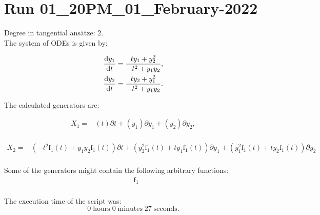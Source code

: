 \section*{Run 01\_20PM\_01\_February-2022}
Degree in tangential ansätze:	2.\\
The system of ODEs is given by:

\begin{align*}
\dv{y_{1}}{t}&=\frac{t y_{1} + y_{2}^{2}}{- t^{2} + y_{1} y_{2}},\\
\dv{y_{2}}{t}&=\frac{t y_{2} + y_{1}^{2}}{- t^{2} + y_{1} y_{2}}.\\
\end{align*}

\noindent The calculated generators are:

\begin{align*}
X_{1}=&\left(t \right)\partial t+\left(y_{1} \right)\partial y_{1}+\left(y_{2} \right)\partial y_{2},\\
\end{align*}

\begin{align*}
X_{2}=&\left(- t^{2} \operatorname{f_{1}}{\left(t \right)}+y_{1} y_{2} \operatorname{f_{1}}{\left(t \right)} \right)\partial t+\left(y_{2}^{2} \operatorname{f_{1}}{\left(t \right)}+t y_{1} \operatorname{f_{1}}{\left(t \right)} \right)\partial y_{1}+\left(y_{1}^{2} \operatorname{f_{1}}{\left(t \right)}+t y_{2} \operatorname{f_{1}}{\left(t \right)} \right)\partial y_{2}\\
\end{align*}



\noindent Some of the generators might contain the following arbitrary functions:
\begin{align*}
&\operatorname{f_{1}}\\
\end{align*}

\noindent The execution time of the script was:
$$0\;\mathrm{hours}\;0\;\mathrm{minutes}\;27 \;\mathrm{seconds}.$$
